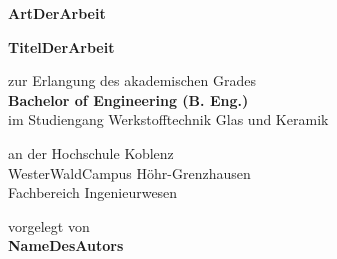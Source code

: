 {\begin{center}
\vspace{3cm} %
{\large \textbf{ArtDerArbeit}} %

\vspace{0.5cm} %
\parbox{0.7\textwidth}{ %
    \begin{center}
        \huge \textbf{TitelDerArbeit} %
    \end{center}
}


\vspace{3cm} %
\parbox{0.7\textwidth}{ %
    \begin{center}
        zur Erlangung des akademischen Grades\\
        \textbf{Bachelor of Engineering (B. Eng.)}\\ %
        im Studiengang Werkstofftechnik Glas und Keramik\\ %
    \end{center}
}

\vspace{1cm} %
\parbox{0.7\textwidth}{ %
    \begin{center}
        an der Hochschule Koblenz\\ %
        WesterWaldCampus H\"ohr-Grenzhausen\\
        Fachbereich Ingenieurwesen %
    \end{center}
}


\vfill %
{\fontsize{12}{12} \selectfont %
    vorgelegt von\\
    \textbf{NameDesAutors} %
}\\
\vspace{1cm} %



\end{center}}
